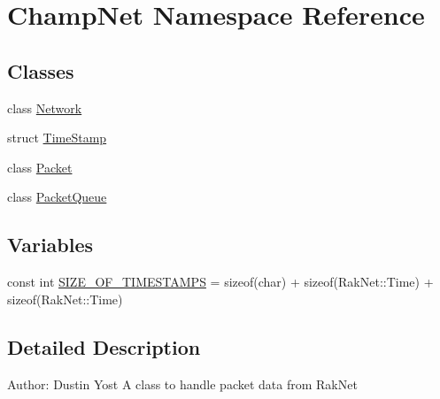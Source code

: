 \hypertarget{namespace_champ_net}{\section{Champ\-Net Namespace Reference}
\label{namespace_champ_net}
}
\subsection*{Classes}
\begin{DoxyCompactItemize}
\item 
class \hyperlink{class_champ_net_1_1_network}{Network}
\item 
struct \hyperlink{struct_champ_net_1_1_time_stamp}{Time\-Stamp}
\item 
class \hyperlink{class_champ_net_1_1_packet}{Packet}
\item 
class \hyperlink{class_champ_net_1_1_packet_queue}{Packet\-Queue}
\end{DoxyCompactItemize}
\subsection*{Variables}
\begin{DoxyCompactItemize}
\item 
const int \hyperlink{group__champnet_gae8bece8e869e20f234d9ae67256a735f}{S\-I\-Z\-E\-\_\-\-O\-F\-\_\-\-T\-I\-M\-E\-S\-T\-A\-M\-P\-S} = sizeof(char) + sizeof(Rak\-Net\-::\-Time) + sizeof(Rak\-Net\-::\-Time)
\end{DoxyCompactItemize}


\subsection{Detailed Description}
Author\-: Dustin Yost A class to handle packet data from Rak\-Net 